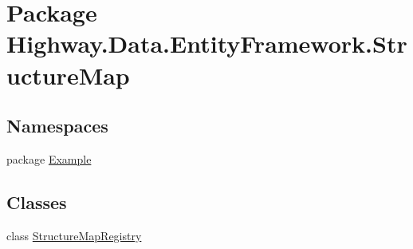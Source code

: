 \hypertarget{namespace_highway_1_1_data_1_1_entity_framework_1_1_structure_map}{\section{Package Highway.\-Data.\-Entity\-Framework.\-Structure\-Map}
\label{namespace_highway_1_1_data_1_1_entity_framework_1_1_structure_map}
}
\subsection*{Namespaces}
\begin{DoxyCompactItemize}
\item 
package \hyperlink{namespace_highway_1_1_data_1_1_entity_framework_1_1_structure_map_1_1_example}{Example}
\end{DoxyCompactItemize}
\subsection*{Classes}
\begin{DoxyCompactItemize}
\item 
class \hyperlink{class_highway_1_1_data_1_1_entity_framework_1_1_structure_map_1_1_structure_map_registry}{Structure\-Map\-Registry}
\end{DoxyCompactItemize}
